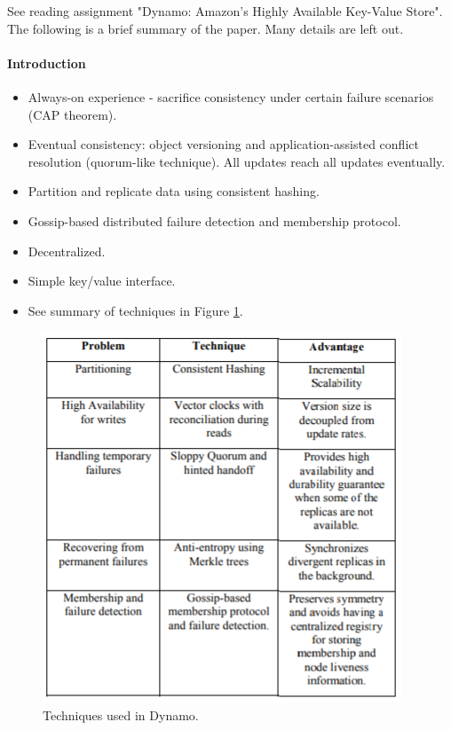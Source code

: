 

See reading assignment "Dynamo: Amazon's Highly Available Key-Value Store". The following is a brief summary of the paper. Many details are left out.

\paragraph{Introduction}
\begin{itemize}
    \item Always-on experience - sacrifice consistency under certain failure scenarios (CAP theorem).
    \item Eventual consistency: object versioning and application-assisted conflict resolution (quorum-like technique). All updates reach all updates eventually.
    \item Partition and replicate data using consistent hashing.
    \item Gossip-based distributed failure detection and membership protocol.
    \item Decentralized.
    \item Simple key/value interface.
    \item See summary of techniques in Figure \ref{fig:dynamo}.
\end{itemize}

\begin{figure}[h]
	\centering
	\includegraphics[scale=0.8]{images/2-dynamo.PNG}
	\caption{Techniques used in Dynamo.}
	\label{fig:dynamo}
\end{figure}

